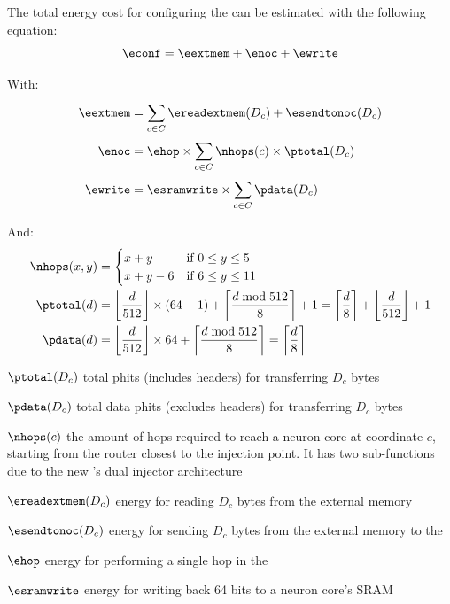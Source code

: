 The total energy cost for configuring the \graicore{} can be estimated with the following equation:
\begin{equation}
    \econf = \eextmem + \enoc + \ewrite
\end{equation}

With:
\begin{align*} 
\eextmem &= 
        \sum_{c \in C}^{}{\ereadextmem(D_c) + \esendtonoc(D_c)} \\
\enoc &=
    \ehop \times \sum_{c \in C}^{}{\nhops(c) \times \ptotal(D_c)} \\
\ewrite &=
    \esramwrite \times \sum_{c \in C}^{}{\pdata(D_c)}
\end{align*}

And:
\begin{align*} 
\nhops(x,y) &=
    \begin{cases} 
        x + y & \textrm{if } 0 \leq y \leq 5 \\
        x + y - 6 & \text{if } 6 \leq y \leq 11
    \end{cases}
\\
\ptotal(d) &=
    \left\lfloor \frac{d}{512} \right\rfloor \times (64 + 1) + \left\lceil \frac{d \bmod 512}{8} \right\rceil + 1 =
    \left\lceil \frac{d}{8} \right\rceil + \left\lfloor \frac{d}{512} \right\rfloor + 1 
\\
\pdata(d) &=
    \left\lfloor \frac{d}{512} \right\rfloor \times 64 + \left\lceil \frac{d \bmod 512}{8} \right\rceil =
    \left\lceil \frac{d}{8} \right\rceil
\end{align*}

\begin{eqexpl}[15mm]
    \item{$\ptotal(D_c)$} total phits (includes headers) for transferring $D_c$ bytes
    \item{$\pdata(D_c)$} total data phits (excludes headers) for transferring $D_c$ bytes
    \item{$\nhops(c)$} the amount of hops required to reach a neuron core at coordinate $c$, starting from the router closest to the injection point. It has two sub-functions due to the new \confignoc{}'s dual injector architecture
    \item{$\ereadextmem(D_c)$} energy for reading $D_c$ bytes from the external memory
    \item{$\esendtonoc(D_c)$} energy for sending $D_c$ bytes from the external memory to the \confignoc{}
    \item{$\ehop$} energy for performing a single hop in the \confignoc{}
    \item{$\esramwrite$} energy for writing back 64 bits to a neuron core's SRAM
\end{eqexpl}

